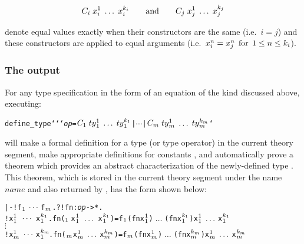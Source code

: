 \[ C_i\;x_i^1\;\ldots\;x_i^{k_i} \qquad {\rm and} \qquad
   C_j\;x_j^1\;\ldots\;x_j^{k_j} \]

\noindent denote equal values exactly when their constructors are the same
(i.e.\ $i=j$) and these constructors are applied to equal arguments
(i.e.\ $x_i^n = x_j^n\;\,{\rm for}\;\,1\leq n\leq k_i$).

\subsubsection{The output}\label{define-type-output}

\noindent For any type specification
in the form of an equation of the kind discussed above, executing:

{\def\op{{\normalsize\sl op}}
\begin{hol}
\begin{alltt}
   define\_type `` `{\op} = \(C\sb{1}\;ty{}\sb{1}\sp{1}\;\ldots\;ty{}\sb{1}\sp{k\sb{1}} \) | \(\cdots\) | \(C\sb{m}\;ty{}\sb{m}\sp{1}\;\ldots\;ty{}\sb{m}\sp{k\sb{m}}\)`
\end{alltt}\end{hol}}

\noindent will make a formal definition for a
type (or  type operator) 
in the current theory segment, make appropriate definitions for
constants  ,
and automatically prove a theorem which
provides an abstract
characterization
of the newly-defined type .  This theorem, which is
stored in the current theory segment under the name $name$ and also returned by
, has the form shown below:

{\def\op{{\normalsize\sl op}}
\begin{hol}\begin{alltt}
   |- !f\(\sb{1}\:\cdots\:\)f\(\sb{m}\). ?!fn:{\op}->*.
         !x\(\sb{1}\sp{1}\;\,\cdots\,\;\)x\(\sb{1}\sp{k\sb{1}}\). fn(\(\sb{1}\,\) x\(\sb{1}\sp{1}\;\,\ldots\,\;\)x\(\sb{1}\sp{k\sb{1}}\)) = f\(\sb{1}\) (fn x\(\sb{1}\sp{1}\))\(\;\ldots\;\)(fn x\(\sb{1}\sp{k\sb{1}}\)) x\(\sb{1}\sp{1}\;\ldots\;\)x\(\sb{1}\sp{k\sb{1}}\)
                                      \(\vdots\)
         !x\(\sb{m}\sp{1}\;\cdots\;\)x\(\sb{1}\sp{k\sb{m}}\!\). fn(\(\sb{m}\) x\(\sb{m}\sp{1}\;\ldots\;\)x\(\sb{m}\sp{k\sb{m}}\)) = f\(\sb{m}\) (fn x\(\sb{m}\sp{1}\))\(\;\ldots\;\)(fn x\(\sb{m}\sp{k\sb{m}}\)) x\(\sb{m}\sp{1}\;\ldots\;\)x\(\sb{m}\sp{k\sb{m}}\)
\end{alltt}\end{hol}}


